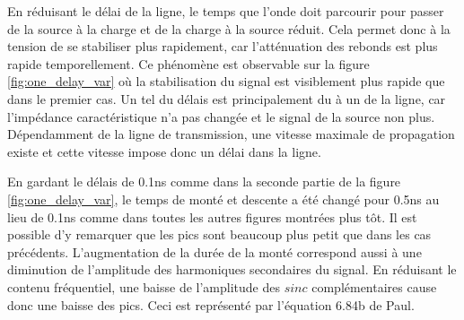 En réduisant le délai de la ligne, le temps que l'onde doit parcourir pour passer de la source à la charge et de la charge à la source réduit. 
Cela permet donc à la tension de se stabiliser plus rapidement, car l'atténuation des rebonds est plus rapide temporellement. 
Ce phénomène est observable sur la figure \ref{fig:one_delay_var} où la stabilisation du signal est visiblement plus rapide que dans le premier cas.
Un tel  du délais est principalement du à un  de la ligne, car l'impédance caractéristique n'a pas changée et le signal de la source non plus. 
Dépendamment de la ligne de transmission, une vitesse maximale de propagation existe et cette vitesse impose donc un délai dans la ligne.



En gardant le délais de 0.1ns comme dans la seconde partie de la figure \ref{fig:one_delay_var}, le temps de monté et descente a été changé pour 0.5ns au lieu de 0.1ns comme dans toutes les autres figures montrées plus tôt.
Il est possible d'y remarquer que les pics sont beaucoup plus petit que dans les cas précédents.
L'augmentation de la durée de la monté correspond aussi à une diminution de l'amplitude des harmoniques secondaires du signal.
En réduisant le contenu fréquentiel, une baisse de l'amplitude des $sinc$ complémentaires cause donc une baisse des pics. 
Ceci est représenté par l'équation 6.84b de Paul.